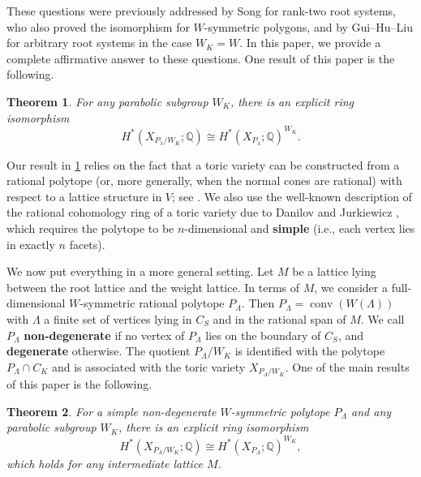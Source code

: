 \documentclass{amsart}
\theoremstyle{plain} \numberwithin{equation}{section}
\newtheorem{theorem}{Theorem}[section]
\theoremstyle{definition}
\newcommand{\Q}{\mathbb{Q}}
\DeclareMathOperator{\conv}{conv}
\begin{document}
These questions were previously addressed by Song \cite{songToricSurfacesReflection2022} for rank-two root systems, who also proved the isomorphism for $W$-symmetric polygons, and by Gui--Hu--Liu \cite{guiWeylGroupSymmetries2025} for arbitrary root systems in the case $W_K = W$. 
In this paper, we provide a complete affirmative answer to these questions.
One result of this paper is the following.
\begin{theorem}\label{coho ring iso}
  For any parabolic subgroup $W_K$, there is an explicit ring isomorphism
  $$H^*(X_{P_{\lambda}/W_K};\Q)\cong H^*(X_{P_{\lambda}};\Q)^{W_K}.$$
\end{theorem}



Our result in \cref{coho ring iso} relies on the fact that a toric variety can be constructed from a rational polytope (or, more generally, when the normal cones are rational) with respect to a lattice structure in $V$; see \cite[\S 5]{danilovGEOMETRYTORICVARIETIES1978}.
We also use the well-known description of the rational cohomology ring of a toric variety due to Danilov \cite{danilovGEOMETRYTORICVARIETIES1978} and Jurkiewicz \cite{jurkiewiczChowRingProjective1980}, which requires  the polytope to be $n$-dimensional and \textbf{simple} (i.e., each vertex lies in exactly $n$ facets).


We now put everything in a more general setting.
Let $M$ be a lattice lying between the root lattice and the weight lattice.
In terms of $M$,  we consider a full-dimensional  $W$-symmetric rational polytope $P_{\Lambda}$. Then  $P_{\Lambda}=\conv\left(W(\Lambda)\right)$ with $\Lambda$ a finite set of  vertices lying in $C_S$ and in the rational span of $M$.
We call $P_{\Lambda}$ \textbf{non-degenerate} if no vertex of $P_{\Lambda}$ lies on the boundary of $C_S$, and \textbf{degenerate} otherwise.
The quotient $P_{\Lambda}/W_K$ is identified with the polytope $P_{\Lambda}\cap C_K$ and is associated with the toric variety $X_{P_{\Lambda}/W_K}$.
One of the main results of this paper is the following.
\begin{theorem}\label{general coho ring iso}
  For a simple non-degenerate $W$-symmetric polytope $P_{\Lambda}$ and any parabolic subgroup $W_K$, there is an explicit ring isomorphism
  $$H^*(X_{P_{\Lambda}/W_K};\Q)\cong H^*(X_{P_{\Lambda}};\Q)^{W_K},$$
  which holds for any intermediate lattice $M$.
\end{theorem}
\end{document}
